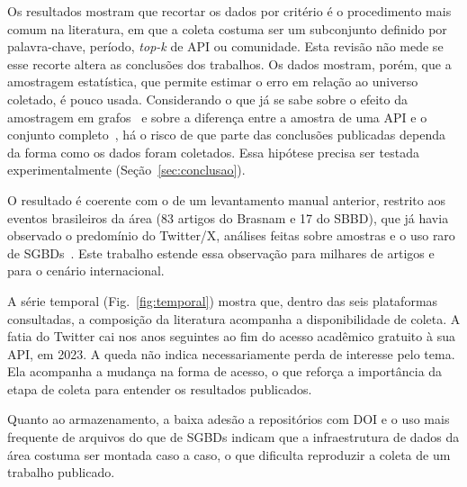 \documentclass[11pt,a4paper]{article}
\begin{document}
Os resultados mostram que recortar os dados por critério é o procedimento mais
comum na literatura, em que a coleta costuma ser um subconjunto definido por
palavra-chave, período, \textit{top-k} de API ou comunidade. Esta revisão não
mede se esse recorte altera as conclusões dos trabalhos. Os dados mostram, porém,
que a amostragem estatística, que permite estimar o erro em relação ao universo
coletado, é pouco usada. Considerando o que já se sabe sobre o efeito da
amostragem em grafos~\citep{leskovec2006sampling} e sobre a diferença entre a
amostra de uma API e o conjunto completo~\citep{morstatter2013sample}, há o risco
de que parte das conclusões publicadas dependa da forma como os dados foram
coletados. Essa hipótese precisa ser testada experimentalmente
(Seção~\ref{sec:conclusao}).

O resultado é coerente com o de um levantamento manual anterior, restrito aos
eventos brasileiros da área (83 artigos do Brasnam e 17 do SBBD), que já havia
observado o predomínio do Twitter/X, análises feitas sobre amostras e o uso raro
de SGBDs~\citep{heine2025database}. Este trabalho estende essa observação para
milhares de artigos e para o cenário internacional.

A série temporal (Fig.~\ref{fig:temporal}) mostra que, dentro das seis
plataformas consultadas, a composição da literatura acompanha a disponibilidade
de coleta. A fatia do Twitter cai nos anos seguintes ao fim do acesso acadêmico
gratuito à sua API, em 2023. A queda não indica necessariamente perda de
interesse pelo tema. Ela acompanha a mudança na forma de acesso, o que reforça a
importância da etapa de coleta para entender os resultados publicados.

Quanto ao armazenamento, a baixa adesão a repositórios com DOI e o uso mais
frequente de arquivos do que de SGBDs indicam que a infraestrutura de dados da
área costuma ser montada caso a caso, o que dificulta reproduzir a coleta de um
trabalho publicado.
\end{document}
